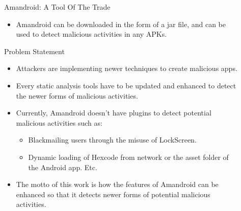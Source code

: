\documentclass[final,hyperref={pdfpagelabels=false}]{beamer}
\begin{document}
\begin{frame}[t]
\begin{columns}[t]
\begin{column}{.465\textwidth}
\begin{block}{Amandroid: A Tool Of The Trade}
\begin {itemize}
\item Amandroid can be downloaded in the form of a jar file, and can be used to detect malicious activities in any APKs.
\end{itemize}
\end{block}


\begin{block}{Problem Statement}
\begin{itemize}
\item Attackers are implementing newer techniques to create malicious apps. 
\item Every static analysis tools have to be updated and enhanced to detect the newer forms of malicious activities. 
\item Currently, Amandroid doesn't have plugins to detect potential malicious activities such as:
\begin{itemize}
\item Blackmailing users through the misuse of LockScreen. 
\item Dynamic loading of Hexcode from network or the asset folder of the Android app. Etc.
\end{itemize}
\item The motto of this work is how the features of Amandroid can be enhanced so that it detects  newer forms of potential malicious activities. 

\end{itemize}

\end{block}

\end{column} %

\begin{column}{.03\textwidth}\end{column} %
 
\begin{column}{.465\textwidth} %



\end{column}
\end{columns}
\end{frame}
\end{document}
